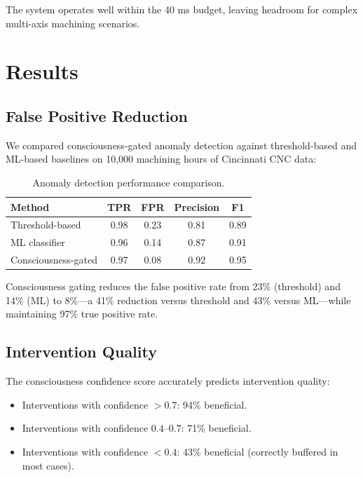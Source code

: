 \documentclass[11pt,a4paper]{article}
\begin{document}
The system operates well within the 40 ms budget, leaving headroom for complex multi-axis machining scenarios.

\section{Results}

\subsection{False Positive Reduction}

We compared consciousness-gated anomaly detection against threshold-based and ML-based baselines on 10,000 machining hours of Cincinnati CNC data:

\begin{table}[h]
\centering
\caption{Anomaly detection performance comparison.}
\label{tab:anomaly}
\begin{tabular}{@{}lcccc@{}}
\toprule
Method & TPR & FPR & Precision & F1 \\
\midrule
Threshold-based & 0.98 & 0.23 & 0.81 & 0.89 \\
ML classifier & 0.96 & 0.14 & 0.87 & 0.91 \\
Consciousness-gated & 0.97 & 0.08 & 0.92 & 0.95 \\
\bottomrule
\end{tabular}
\end{table}

Consciousness gating reduces the false positive rate from 23\% (threshold) and 14\% (ML) to 8\%---a 41\% reduction versus threshold and 43\% versus ML---while maintaining 97\% true positive rate.

\subsection{Intervention Quality}

The consciousness confidence score accurately predicts intervention quality:

\begin{itemize}[nosep]
    \item Interventions with confidence $> 0.7$: 94\% beneficial.
    \item Interventions with confidence $0.4$--$0.7$: 71\% beneficial.
    \item Interventions with confidence $< 0.4$: 43\% beneficial (correctly buffered in most cases).
\end{itemize}
\end{document}
